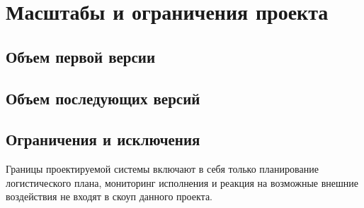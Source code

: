 \chapter{Масштабы и ограничения проекта}
\label{ch:chap3}


\section{Объем первой версии}
\label{sec:mvp}


\section{Объем последующих версий}
\label{sec:next}


\section{Ограничения и исключения}
\label{sec:restrictions}

Границы проектируемой системы включают в себя только планирование логистического плана, мониторинг исполнения и реакция на возможные внешние воздействия не входят в скоуп данного проекта.

\endinput
